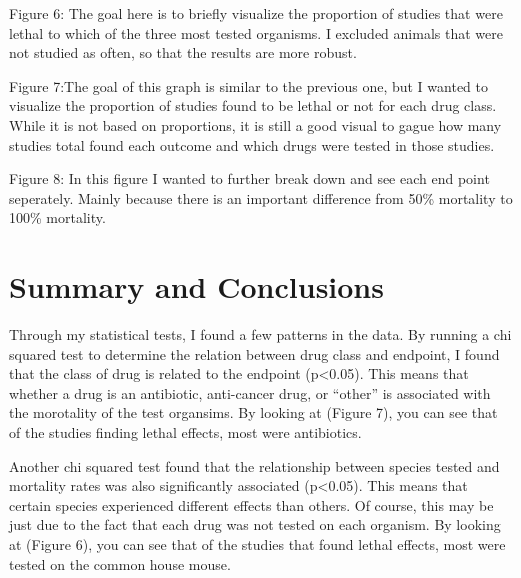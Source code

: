 \documentclass[12pt,]{article}
\begin{document}
Figure 6: The goal here is to briefly visualize the proportion of
studies that were lethal to which of the three most tested organisms. I
excluded animals that were not studied as often, so that the results are
more robust.

Figure 7:The goal of this graph is similar to the previous one, but I
wanted to visualize the proportion of studies found to be lethal or not
for each drug class. While it is not based on proportions, it is still a
good visual to gague how many studies total found each outcome and which
drugs were tested in those studies.

Figure 8: In this figure I wanted to further break down and see each end
point seperately. Mainly because there is an important difference from
50\% mortality to 100\% mortality.

\newpage

\section{Summary and Conclusions}\label{summary-and-conclusions}

Through my statistical tests, I found a few patterns in the data. By
running a chi squared test to determine the relation between drug class
and endpoint, I found that the class of drug is related to the endpoint
(p\textless{}0.05). This means that whether a drug is an antibiotic,
anti-cancer drug, or ``other'' is associated with the morotality of the
test organsims. By looking at (Figure 7), you can see that of the
studies finding lethal effects, most were antibiotics.

Another chi squared test found that the relationship between species
tested and mortality rates was also significantly associated
(p\textless{}0.05). This means that certain species experienced
different effects than others. Of course, this may be just due to the
fact that each drug was not tested on each organism. By looking at
(Figure 6), you can see that of the studies that found lethal effects,
most were tested on the common house mouse.
\end{document}

